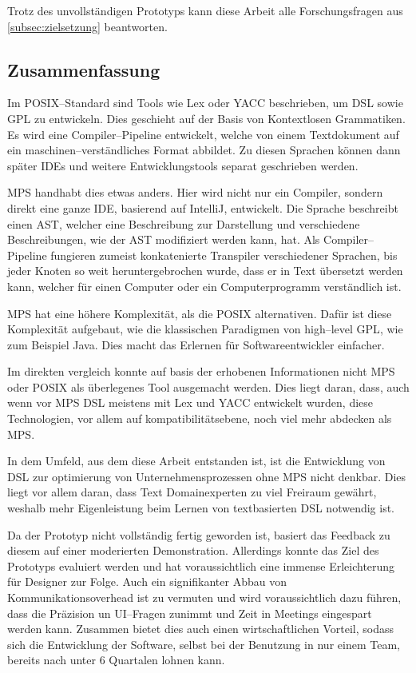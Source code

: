 Trotz des unvollständigen Prototyps kann diese Arbeit alle Forschungsfragen aus \autoref{subsec:zielsetzung} beantworten.

\subsection{Zusammenfassung}\label{subsec:zusammenfassung}
Im \acs{POSIX}--Standard sind Tools wie Lex oder \ac{YACC} beschrieben, um \ac{DSL} sowie \ac{GPL} zu entwickeln.
Dies geschieht auf der Basis von Kontextlosen Grammatiken.
Es wird eine Compiler--Pipeline entwickelt, welche von einem Textdokument auf ein maschinen--verständliches Format abbildet.
Zu diesen Sprachen können dann später \acp{IDE} und weitere Entwicklungstools separat geschrieben werden.

\ac{MPS} handhabt dies etwas anders.
Hier wird nicht nur ein Compiler, sondern direkt eine ganze \ac{IDE}, basierend auf IntelliJ, entwickelt.
Die Sprache beschreibt einen \ac{AST}, welcher eine Beschreibung zur Darstellung und verschiedene Beschreibungen, wie der \ac{AST} modifiziert werden kann, hat.
Als Compiler--Pipeline fungieren zumeist konkatenierte Transpiler verschiedener Sprachen, bis jeder Knoten so weit heruntergebrochen wurde, dass er in Text übersetzt werden kann, welcher für einen Computer oder ein Computerprogramm verständlich ist.

\ac{MPS} hat eine höhere Komplexität, als die \ac{POSIX} alternativen.
Dafür ist diese Komplexität aufgebaut, wie die klassischen Paradigmen von high--level \ac{GPL}, wie zum Beispiel Java.
Dies macht das Erlernen für Softwareentwickler einfacher.

Im direkten vergleich konnte auf basis der erhobenen Informationen nicht \ac{MPS} oder \ac{POSIX} als überlegenes Tool ausgemacht werden.
Dies liegt daran, dass, auch wenn vor \ac{MPS} \ac{DSL} meistens mit Lex und \ac{YACC} entwickelt wurden, diese Technologien, vor allem auf kompatibilitätsebene, noch viel mehr abdecken als \ac{MPS}.

In dem Umfeld, aus dem diese Arbeit entstanden ist, ist die Entwicklung von \ac{DSL} zur optimierung von Unternehmensprozessen ohne \ac{MPS} nicht denkbar.
Dies liegt vor allem daran, dass Text Domainexperten zu viel Freiraum gewährt, weshalb mehr Eigenleistung beim Lernen von textbasierten \ac{DSL} notwendig ist.

Da der Prototyp nicht vollständig fertig geworden ist, basiert das Feedback zu diesem auf einer moderierten Demonstration.
Allerdings konnte das Ziel des Prototyps evaluiert werden und hat voraussichtlich eine immense Erleichterung für Designer zur Folge.
Auch ein signifikanter Abbau von Kommunikationsoverhead ist zu vermuten und wird voraussichtlich dazu führen, dass die Präzision un \acs{UI}--Fragen zunimmt und Zeit in Meetings eingespart werden kann.
Zusammen bietet dies auch einen wirtschaftlichen Vorteil, sodass sich die Entwicklung der Software, selbst bei der Benutzung in nur einem Team, bereits nach unter 6 Quartalen lohnen kann.


